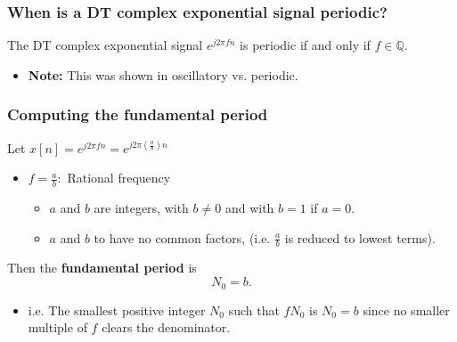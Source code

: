     \subsubsection{When is a DT complex exponential signal periodic?}
    \begin{theorem}
        The DT complex exponential signal \( e^{j 2 \pi f n} \) is periodic if and only if \( f \in \mathbb{Q} \).
        \begin{itemize}
            \item \textbf{Note:} This was shown in oscillatory vs. periodic.
        \end{itemize}
    \end{theorem}

    \subsubsection{Computing the fundamental period}
    \begin{definition}
         Let \( x[n] = e^{j 2 \pi f n} = e^{j 2 \pi \left( \frac{a}{b} \right) n}\) 
         \begin{itemize}
            \item \( f = \frac{a}{b}: \) Rational frequency
            \begin{itemize}
                \item \(a\) and \(b\) are integers, with \(b \neq 0\) and with \(b = 1\) if \(a = 0\). 
                \item \(a\) and \(b\) to have no common factors, (i.e. \(\frac{a}{b}\) is reduced to lowest terms).
            \end{itemize}
         \end{itemize}
         \vspace{1em}
         Then the \textbf{fundamental period} is 
            \[
            N_0 = b.
            \]
        \begin{itemize}
            \item i.e. The smallest positive integer \(N_0\) such that \(fN_0\) is $N_0 =b$ since no smaller multiple of \(f\) clears the denominator.
        \end{itemize}
    \end{definition}



